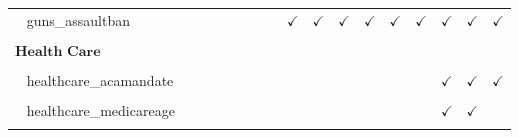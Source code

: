 \documentclass[
  12pt]{article}
\begin{document}
\begin{table}[H]
{\begin{tabular}{lcccccccccccccccc}
$\hspace{10pt}$guns\_assaultban &  &  &  &  &  &  &  & $\checkmark$ & $\checkmark$ & $\checkmark$ & $\checkmark$ & $\checkmark$ & $\checkmark$ & $\checkmark$ & $\checkmark$ & $\checkmark$\\
\cellcolor{gray!6}{$\hspace{10pt}$guns\_permits} & \cellcolor{gray!6}{} & \cellcolor{gray!6}{} & \cellcolor{gray!6}{} & \cellcolor{gray!6}{} & \cellcolor{gray!6}{} & \cellcolor{gray!6}{} & \cellcolor{gray!6}{} & \cellcolor{gray!6}{$\checkmark$} & \cellcolor{gray!6}{$\checkmark$} & \cellcolor{gray!6}{$\checkmark$} & \cellcolor{gray!6}{$\checkmark$} & \cellcolor{gray!6}{$\checkmark$} & \cellcolor{gray!6}{$\checkmark$} & \cellcolor{gray!6}{$\checkmark$} & \cellcolor{gray!6}{$\checkmark$} & \cellcolor{gray!6}{$\checkmark$}\\
$\textbf{Health Care}$ &  &  &  &  &  &  &  &  &  &  &  &  &  &  &  & \\
\cellcolor{gray!6}{$\hspace{10pt}$healthcare\_aca} & \cellcolor{gray!6}{} & \cellcolor{gray!6}{} & \cellcolor{gray!6}{} & \cellcolor{gray!6}{} & \cellcolor{gray!6}{} & \cellcolor{gray!6}{} & \cellcolor{gray!6}{$\checkmark$} & \cellcolor{gray!6}{$\checkmark$} & \cellcolor{gray!6}{$\checkmark$} & \cellcolor{gray!6}{$\checkmark$} & \cellcolor{gray!6}{$\checkmark$} & \cellcolor{gray!6}{$\checkmark$} & \cellcolor{gray!6}{$\checkmark$} & \cellcolor{gray!6}{$\checkmark$} & \cellcolor{gray!6}{$\checkmark$} & \cellcolor{gray!6}{$\checkmark$}\\
$\hspace{10pt}$healthcare\_acamandate &  &  &  &  &  &  &  &  &  &  &  &  &  & $\checkmark$ & $\checkmark$ & $\checkmark$\\
\cellcolor{gray!6}{$\hspace{10pt}$healthcare\_medicare} & \cellcolor{gray!6}{} & \cellcolor{gray!6}{} & \cellcolor{gray!6}{} & \cellcolor{gray!6}{} & \cellcolor{gray!6}{} & \cellcolor{gray!6}{} & \cellcolor{gray!6}{} & \cellcolor{gray!6}{} & \cellcolor{gray!6}{} & \cellcolor{gray!6}{} & \cellcolor{gray!6}{} & \cellcolor{gray!6}{} & \cellcolor{gray!6}{$\checkmark$} & \cellcolor{gray!6}{$\checkmark$} & \cellcolor{gray!6}{$\checkmark$} & \cellcolor{gray!6}{$\checkmark$}\\
$\hspace{10pt}$healthcare\_medicareage &  &  &  &  &  &  &  &  &  &  &  &  &  & $\checkmark$ & $\checkmark$ & \\
\cellcolor{gray!6}{$\textbf{Immigration}$} & \cellcolor{gray!6}{} & \cellcolor{gray!6}{} & \cellcolor{gray!6}{} & \cellcolor{gray!6}{} & \cellcolor{gray!6}{} & \cellcolor{gray!6}{} & \cellcolor{gray!6}{} & \cellcolor{gray!6}{} & \cellcolor{gray!6}{} & \cellcolor{gray!6}{} & \cellcolor{gray!6}{} & \cellcolor{gray!6}{} & \cellcolor{gray!6}{} & \cellcolor{gray!6}{} & \cellcolor{gray!6}{} & \cellcolor{gray!6}{}\\

\end{tabular}}
\end{table}
\end{document}
